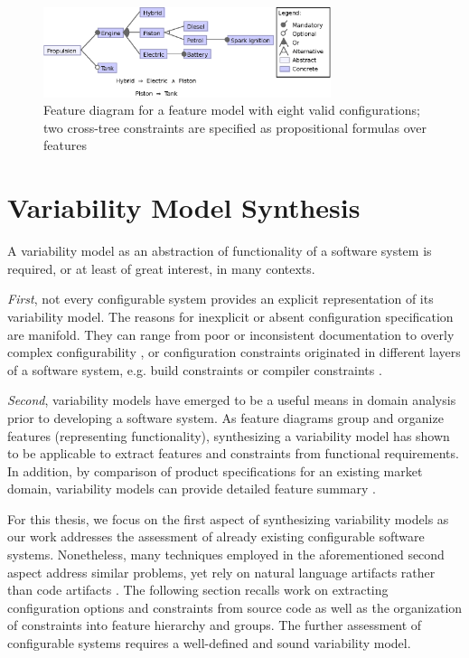 \begin{figure}[htbp]
  \centering
  
  	\includegraphics[width=0.75\textwidth]{images/introduction_fm.eps}
  \caption{Feature diagram for a feature model with eight valid configurations;
  two cross-tree constraints are specified as propositional formulas over
  features}
  \label{fig:introduction_fm}
\end{figure}

\section{Variability Model Synthesis}  \label{sec:feature_model_synthesis}
A variability model as an abstraction of functionality of a software system is
required, or at least of great interest, in many contexts. 

\emph{First}, not
every configurable system provides an explicit
representation of its variability model. 
The reasons for inexplicit or absent configuration specification are manifold.
They can range from poor or inconsistent documentation
\citep{rabkin_static_2011} to overly complex configurability
\citep{xu_hey_2015}, or configuration constraints originated in different layers of a software
system, e.g. build constraints  or compiler constraints \citep{nadi_where_2015}. 

\emph{Second}, variability models have emerged to be a useful means in domain
analysis prior to developing a software system. As feature diagrams group and
organize features (representing functionality), synthesizing a variability model
has shown to be applicable to extract features and constraints from functional requirements.
In addition, by comparison of product specifications for an
existing market domain, variability models can provide detailed feature
summary \citep{alves_exploratory_2008,bakar_feature_2015}.

For this thesis, we focus on the first aspect of synthesizing variability
models as our work addresses the assessment of already existing configurable
software systems. Nonetheless, many techniques employed in the aforementioned
second aspect address similar problems, yet rely on natural language artifacts
rather than code artifacts \citep{alves_exploratory_2008,bakar_feature_2015}.
The following section recalls work on extracting configuration options and
constraints from source code as well as the organization of constraints into
feature hierarchy and groups. The further assessment of configurable systems
requires a well-defined and sound variability model.

